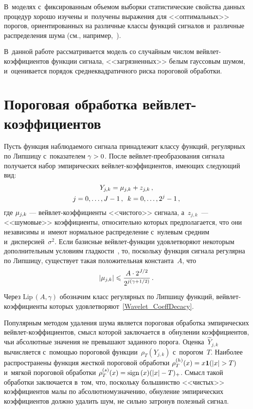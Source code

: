 \begin{multicols}{2}
 В~моделях с~фиксированным объемом выборки 
 статистические свойства данных процедур хорошо изучены и~получены 
 выражения для <<оптимальных>> порогов, ориентированных на различные 
 классы функций сигналов и~различные распределения шума (см., например,~\cite{DJ94, DJ95, DJ98, Jan01, Jan06, SH17}). 
 
 В~данной работе рассматривается модель со случайным чис\-лом 
 вейв\-лет-ко\-эф\-фи\-ци\-ен\-тов 
 функции сигнала, <<загрязненных>> белым гауссовым шумом, и~оценивается 
 порядок сред\-не\-квад\-ра\-тич\-но\-го риска пороговой обработки.


\section{Пороговая обработка вейвлет-коэффициентов}

Пусть функция наблюдаемого сигнала принадлежит классу 
функций, регулярных по Липшицу с~показателем $\gamma\hm>0$. 
После вейв\-лет-пре\-об\-ра\-зо\-ва\-ния сигнала получается набор 
эмпирических вейв\-лет-ко\-эф\-фи\-ци\-ен\-тов, 
име\-ющих сле\-ду\-ющий вид:
\begin{multline}
\label{data_model}
Y_{j,k}=\mu_{j,k}+z_{j,k}\,, \\
 j=0,\ldots,J-1\,,\enskip k=0,\ldots,2^j-1\,,
\end{multline}
где $\mu_{j,k}$ --- вейв\-лет-ко\-эф\-фи\-ци\-ен\-ты <<чис\-то\-го>> 
сигнала, а~$z_{j,k}$~--- <<шумовые>> коэффициенты, относительно которых 
предполагается, что они независимы и~имеют нормальное распределение с~нулевым 
средним и~дис\-пер\-си\-ей~$\sigma^2$. Если базисные вейв\-лет-функ\-ции
 удовлетворяют некоторым дополнительным условиям глад\-кости~\cite{Mal99}, то, 
 поскольку функция сигнала регулярна по Липшицу, существует такая положительная 
 константа~$A$, что
 \begin{equation}
\label{Wavelet_CoeffDecacy}
\left\vert\mu_{j,k}\right\vert\leqslant\displaystyle\frac{\displaystyle A \cdot2^{J/2}\mathstrut}{\displaystyle 2^{j\left(\gamma+1/2\right)}\mathstrut}\,.
\end{equation}
Через $\mathrm{Lip}\,(A,\gamma)$ обозначим класс регулярных по Липшицу функций, 
вейв\-лет-ко\-эф\-фи\-ци\-ен\-ты которых удовлетворяют~\eqref{Wavelet_CoeffDecacy}.

Популярным методом удаления шума является пороговая обработка эмпирических 
вейв\-лет-ко\-эф\-фи\-ци\-ен\-тов, смысл которой заключается в~обнулении коэффициентов, 
чьи абсолютные значения не превышают заданного порога. Оценка~$\hat{Y}_{j,k}$ 
вы\-чис\-ля\-ет\-ся с~по\-мощью пороговой функции~$\rho_T(Y_{j,k})$ с~порогом~$T$.
 Наиболее распространены функ\-ция жест\-кой пороговой обработки $\rho_T^{(h)}(x)\hm=
 x \mathbf{1} (|x|\hm>T)$ и~мягкой пороговой обработки $\rho_T^{(s)}(x)\hm=
 {\mathrm{sign}}\,(x)(|x|\hm-T)_+$. Смысл такой обработки заключается в~том, что,
  поскольку большинство <<чис\-тых>> коэффициентов малы по абсолютному\linebreak значению, 
  обнуление эмпирических коэффициентов должно удалить шум, не сильно за\-тро\-нув
   полезный сигнал.


\end{multicols}
